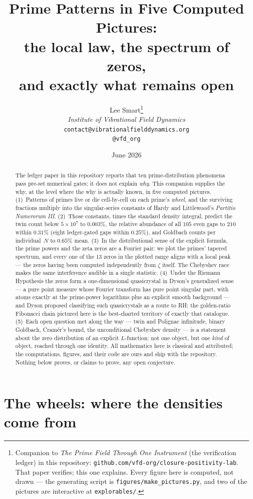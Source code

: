 \documentclass[11pt]{article}
\title{Prime Patterns in Five Computed Pictures:\\
the local law, the spectrum of zeros,\\ and exactly what remains open}
\author{%
  Lee Smart\thanks{Companion to \emph{The Prime Field Through One
Instrument} (the verification ledger) in this repository:
\texttt{github.com/vfd-org/closure-positivity-lab}. That paper verifies;
this one explains. Every figure here is computed, not drawn --- the
generating script is \texttt{figures/make\_pictures.py}, and two of the
pictures are interactive at \texttt{explorables/}.}\\[4pt]
  \textit{Institute of Vibrational Field Dynamics}\\[2pt]
  \texttt{contact@vibrationalfielddynamics.org}\\[2pt]
  \texttt{@vfd\_org}%
}
\date{June 2026}
\begin{document}
\maketitle

\begin{abstract}\noindent
The ledger paper in this repository reports that ten prime-distribution
phenomena pass pre-set numerical gates; it does not explain \emph{why}.
This companion supplies the why, at the level where the why is actually
known, in five computed pictures. (1)~Patterns of primes live or die
cell-by-cell on each prime's \emph{wheel}, and the surviving fractions
multiply into the singular-series constants of Hardy and Littlewood's
\emph{Partitio Numerorum III}. (2)~Those constants, times the standard
density integral, predict the twin count below $5\times10^7$ to $0.003\%$,
the relative abundance of all $105$ even gaps to $210$ within $0.31\%$
(eight ledger-gated gaps within $0.25\%$), and Goldbach counts per
individual~$N$ to $0.65\%$ mean. (3)~In the distributional sense of the
explicit formula, the prime powers and the zeta zeros are a Fourier
pair: we plot the primes' tapered spectrum, and every one of the $13$
zeros in the plotted range aligns with a local peak --- the zeros having been computed
independently from $\zeta$ itself. The Chebyshev race makes the same
interference audible in a single statistic. (4)~Under the Riemann
Hypothesis the zeros form a one-dimensional quasicrystal in Dyson's
generalized sense --- a pure point measure whose Fourier transform has
pure point singular part, with atoms exactly at the prime-power
logarithms plus an explicit smooth background --- and Dyson proposed
classifying such quasicrystals as a route to RH; the golden-ratio
Fibonacci chain pictured here is the best-charted territory of exactly
that catalogue. (5)~Each open question met along the way ---
twin and Polignac infinitude, binary Goldbach, Cram\'er's bound, the
unconditional Chebyshev density --- is a statement about the zero
distribution of an explicit $L$-function: not one object, but one
\emph{kind} of object, reached through one identity. All mathematics here
is classical and attributed; the computations, figures, and their code are
ours and ship with the repository. Nothing below proves, or claims to
prove, any open conjecture.
\end{abstract}

\section{The wheels: where the densities come from}
\end{document}
